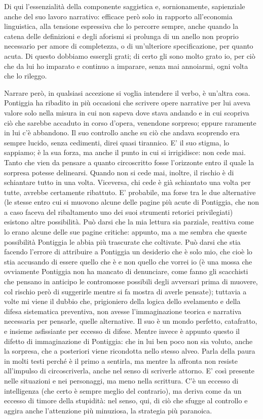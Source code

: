 Di qui l’essenzialità della componente saggistica e, sornionamente, sapienziale anche del suo lavoro narrativo: efficace però solo in rapporto all’economia linguistica, alla tensione espressiva che lo percorre sempre, anche quando la catena delle definizioni e degli aforismi si prolunga di un anello non proprio necessario per amore di completezza, o di un’ulteriore specificazione, per quanto acuta.
Di questo dobbiamo essergli grati; di certo gli sono molto grato io, per ciò che da lui ho imparato e continuo a imparare, senza mai annoiarmi, ogni volta che lo rileggo.

Narrare però, in qualsiasi accezione si voglia intendere il verbo, è un’altra cosa. Pontiggia ha ribadito in più occasioni che scrivere opere narrative per lui aveva valore solo nella misura in cui non sapeva dove stava andando e in cui scopriva ciò che sarebbe accaduto in corso d’opera, venendone sorpreso; eppure raramente in lui c’è abbandono. Il suo controllo anche su ciò che andava scoprendo era sempre lucido, senza cedimenti, direi quasi tirannico. E’ il suo stigma, lo sappiamo; è la sua forza, ma anche il punto in cui si irrigidisce: non cede mai. Tanto che vien da pensare a quanto circoscritto fosse l’orizzonte entro il quale la sorpresa potesse delinearsi. Quando non si cede mai, inoltre, il rischio è di schiantare tutto in una volta. Viceversa, chi cede è già schiantato una volta per tutte, avrebbe certamente ribattuto. E’ probabile, ma forse tra le due alternative (le stesse entro cui si muovono alcune delle pagine più acute di Pontiggia, che non a caso faceva del ribaltamento uno dei suoi strumenti retorici privilegiati) esistono altre possibilità. Può darsi che la mia lettura sia parziale, reattiva come lo erano alcune delle sue pagine critiche: appunto, ma a me sembra che queste possibilità Pontiggia le abbia più trascurate che coltivate. Può darsi che stia facendo l’errore di attribuire a Pontiggia un desiderio che è solo mio, che cioè lo stia accusando di essere quello che è e non quello che vorrei io (è una mossa che ovviamente Pontiggia non ha mancato di denunciare, come fanno gli scacchisti che pensano in anticipo le contromosse possibili degli avversari prima di muovere, col rischio però di suggerirle mentre si fa mostra di averle pensate); tuttavia a volte mi viene il dubbio che, prigioniero della logica dello svelamento e della difesa sistematica preventiva, non avesse l’immaginazione teorica e narrativa necessaria per pensarle, quelle alternative. Il suo è un mondo perfetto, catafratto, e insieme asfissiante per eccesso di difese. Mentre invece è appunto questo il difetto di immaginazione di Pontiggia: che in lui ben poco non sia voluto, anche la sorpresa, che a posteriori viene ricondotta nello stesso alveo. Parla della paura in molti testi perché è il primo a sentirla, ma mentre la affronta non resiste all’impulso di circoscriverla, anche nel senso di scriverle attorno. E’ così presente nelle situazioni e nei personaggi, ma meno nella scrittura. C’è un eccesso di intelligenza (che certo è sempre meglio del contrario), ma deriva come da un eccesso di timore della stupidità: nel senso, qui, di ciò che sfugge al controllo e aggira anche l’attenzione più minuziosa, la strategia più paranoica.

